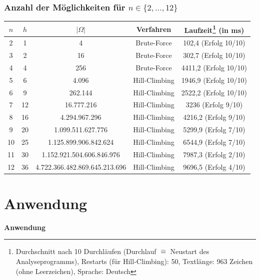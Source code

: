 \documentclass{beamer}
\begin{document}
\begin{frame}\frametitle{Anzahl der Möglichkeiten für $n\in\{2,\dotsc ,12\}$}

{\footnotesize
\begin{tabular}{c|c|c|c|c}
$n$ & $h$ & $|\Omega|$ & Verfahren  & Laufzeit\footnote{\tiny Durchschnitt nach 10 Durchläufen (Durchlauf $\hat{=}$ Neustart des Analyseprogramms), Restarts (für Hill-Climbing): 50, Textlänge: 963 Zeichen (ohne Leerzeichen), Sprache: Deutsch} (in ms)\\\hline
2 & 1 & 4 & Brute-Force & 102,4 {\tiny(Erfolg 10/10)}\\
3 & 2 & 16 & Brute-Force & 302,7 {\tiny(Erfolg 10/10)}\\
4 & 4 & 256 & Brute-Force & 4411,2 {\tiny(Erfolg 10/10)}\\
5 & 6 & 4.096 & Hill-Climbing &1946,9 {\tiny(Erfolg 10/10)}\\	
6 & 9 & 262.144 & Hill-Climbing & 2522,2 {\tiny(Erfolg 10/10)}\\
7 & 12 & 16.777.216 & Hill-Climbing & 3236 {\tiny(Erfolg 9/10)}\\
8 & 16 & 4.294.967.296 & Hill-Climbing & 4216,2 {\tiny(Erfolg 9/10)}\\
9 & 20 & 1.099.511.627.776 & Hill-Climbing & 5299,9 {\tiny(Erfolg 7/10)}\\
10 & 25 & 1.125.899.906.842.624 & Hill-Climbing & 6544,9 {\tiny(Erfolg 7/10)}\\
11 & 30 & 1.152.921.504.606.846.976 & Hill-Climbing & 7987,3 {\tiny(Erfolg 2/10)}\\
12 & 36 & 4.722.366.482.869.645.213.696 & Hill-Climbing & 9696,5 {\tiny(Erfolg 4/10)}
\end{tabular}}
\end{frame}


\section{Anwendung} 
\begin{frame}
\begin{center}
\textbf{\huge Anwendung}
\end{center}
\end{frame}
\end{document}
